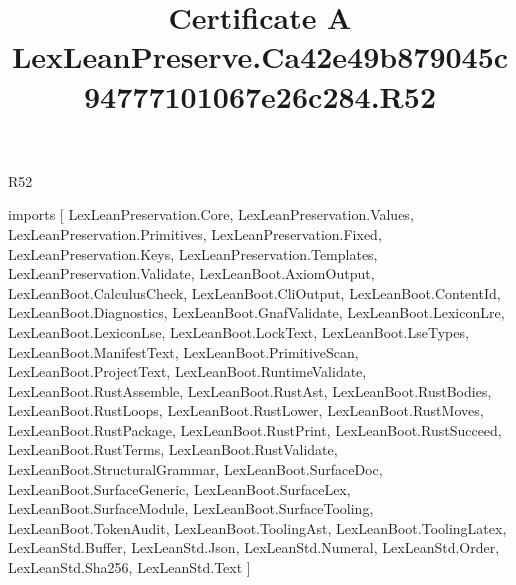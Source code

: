 \begin{lexlean}{R52}
\title{Certificate A LexLeanPreserve.Ca42e49b879045c94777101067e26c284.R52}
\begin{coremodule}
imports [
  LexLeanPreservation.Core,
  LexLeanPreservation.Values,
  LexLeanPreservation.Primitives,
  LexLeanPreservation.Fixed,
  LexLeanPreservation.Keys,
  LexLeanPreservation.Templates,
  LexLeanPreservation.Validate,
  LexLeanBoot.AxiomOutput,
  LexLeanBoot.CalculusCheck,
  LexLeanBoot.CliOutput,
  LexLeanBoot.ContentId,
  LexLeanBoot.Diagnostics,
  LexLeanBoot.GnafValidate,
  LexLeanBoot.LexiconLre,
  LexLeanBoot.LexiconLse,
  LexLeanBoot.LockText,
  LexLeanBoot.LseTypes,
  LexLeanBoot.ManifestText,
  LexLeanBoot.PrimitiveScan,
  LexLeanBoot.ProjectText,
  LexLeanBoot.RuntimeValidate,
  LexLeanBoot.RustAssemble,
  LexLeanBoot.RustAst,
  LexLeanBoot.RustBodies,
  LexLeanBoot.RustLoops,
  LexLeanBoot.RustLower,
  LexLeanBoot.RustMoves,
  LexLeanBoot.RustPackage,
  LexLeanBoot.RustPrint,
  LexLeanBoot.RustSucceed,
  LexLeanBoot.RustTerms,
  LexLeanBoot.RustValidate,
  LexLeanBoot.StructuralGrammar,
  LexLeanBoot.SurfaceDoc,
  LexLeanBoot.SurfaceGeneric,
  LexLeanBoot.SurfaceLex,
  LexLeanBoot.SurfaceModule,
  LexLeanBoot.SurfaceTooling,
  LexLeanBoot.TokenAudit,
  LexLeanBoot.ToolingAst,
  LexLeanBoot.ToolingLatex,
  LexLeanStd.Buffer,
  LexLeanStd.Json,
  LexLeanStd.Numeral,
  LexLeanStd.Order,
  LexLeanStd.Sha256,
  LexLeanStd.Text
]


\end{coremodule}
\end{lexlean}
